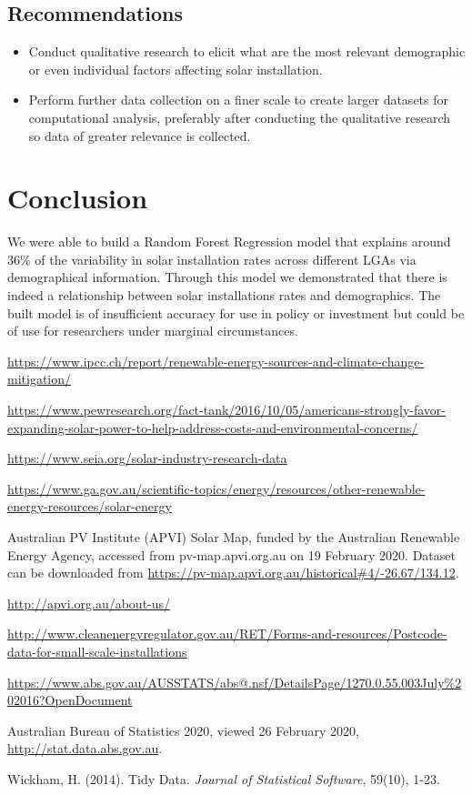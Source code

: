 \documentclass[a4paper]{article}
\begin{document}
\subsection{Recommendations}

\begin{itemize}
\item Conduct qualitative research to elicit what are the most relevant demographic or even individual factors affecting solar installation.
\item Perform further data collection on a finer scale to create larger datasets for computational analysis, preferably after conducting the qualitative research so data of greater relevance is collected.
\end{itemize}

\section{Conclusion}

We were able to build a Random Forest Regression model that explains around 36\% of the variability in solar installation rates across different LGAs via demographical information. Through this model we demonstrated that there is indeed a relationship between solar installations rates and demographics. The built model is of insufficient accuracy for use in policy or investment but could be of use for researchers under marginal circumstances.

\medskip

\begin{thebibliography}{9}

\url{https://www.ipcc.ch/report/renewable-energy-sources-and-climate-change-mitigation/}

\url{https://www.pewresearch.org/fact-tank/2016/10/05/americans-strongly-favor-expanding-solar-power-to-help-address-costs-and-environmental-concerns/}

\url{https://www.seia.org/solar-industry-research-data}

\url{https://www.ga.gov.au/scientific-topics/energy/resources/other-renewable-energy-resources/solar-energy}

Australian PV Institute (APVI) Solar Map, funded by the Australian Renewable Energy Agency, accessed from pv-map.apvi.org.au on 19 February 2020. Dataset can be downloaded from \url{https://pv-map.apvi.org.au/historical#4/-26.67/134.12}.

\url{http://apvi.org.au/about-us/}

\url{http://www.cleanenergyregulator.gov.au/RET/Forms-and-resources/Postcode-data-for-small-scale-installations}

\url{https://www.abs.gov.au/AUSSTATS/abs@.nsf/DetailsPage/1270.0.55.003July%202016?OpenDocument}

Australian Bureau of Statistics 2020, viewed 26 February 2020, \url{http://stat.data.abs.gov.au}.

Wickham, H. (2014). Tidy Data. \textit{Journal of Statistical Software}, 59(10), 1-23.

\end{thebibliography}
\end{document}
